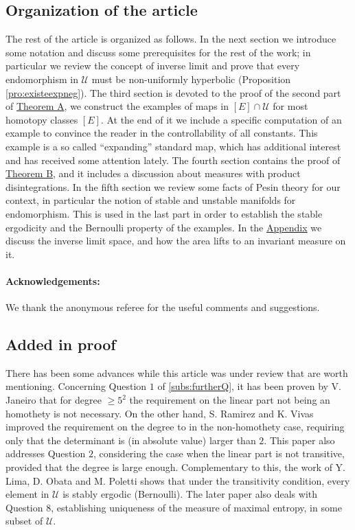 \documentclass[11pt,letterpaper,reqno]{article}
\begin{document}
\subsection{Organization of the article}

The rest of the article is organized as follows. In the next section we introduce some notation and discuss some prerequisites for the rest of the work; in particular we review the concept of inverse limit and prove that every endomorphism in $\mathcal U$ must be non-uniformly hyperbolic (Proposition \ref{pro:existeexpneg}). The third section is devoted to the proof of the second part of \hyperlink{theoremA}{Theorem A}, we construct the examples of maps in $[E]\cap\mathcal U$ for most homotopy classes $[E]$. At the end of it we include a specific computation of an example to convince the reader in the controllability of all constants. This example is a so called ``expanding'' standard map, which has additional interest and has received some attention lately. The fourth section contains the proof of \hyperlink{theoremB}{Theorem B}, and it includes a discussion about measures with product disintegrations.  In the fifth section we review some facts of Pesin theory for our context, in particular the notion of stable and unstable manifolds for endomorphism. This is used in the last part in order to establish the stable ergodicity and the Bernoulli property of the examples. In the \hyperlink{sec:appendix}{Appendix} we discuss the inverse limit space, and how the area lifts to an invariant measure on it.

\paragraph{Acknowledgements:} We thank the anonymous referee for the useful comments and suggestions.
 



\subsection{Added in proof}

There has been some advances while this article was under review that are worth mentioning. Concerning Question $1$ of \ref{subs:furtherQ}, it has been proven by V. Janeiro \cite{Janeiro2023} that for degree $\geq 5^2$ the requirement on the linear part not being an homothety is not necessary. On the other hand, S. Ramirez and K. Vivas \cite{Ramirez2023} improved the requirement on the degree to in the non-homothety case, requiring only that the determinant is (in absolute value) larger than $2$. This paper also addresses Question $2$, considering the case when the linear part is not transitive, provided that the degree is large enough. Complementary to this, the work of Y. Lima, D. Obata and M. Poletti \cite{Lima2024} shows that under the transitivity condition, every element in $\mathcal U$ is stably ergodic (Bernoulli). The later paper also deals with Question $8$, establishing uniqueness of the measure of maximal entropy, in some subset of $\mathcal U$.
\end{document}
